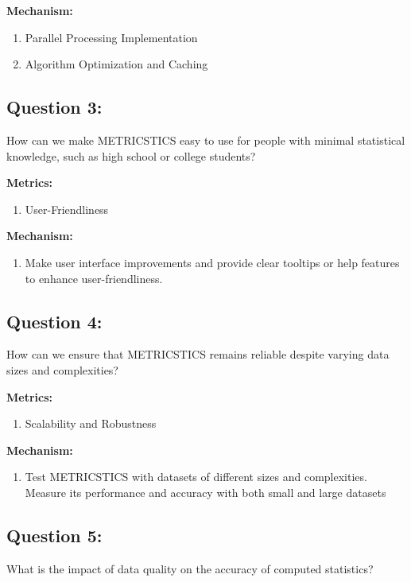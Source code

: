 \documentclass[12pt,letterpaper]{report}
\begin{document}
\item \textbf{Mechanism:}

\begin{enumerate}
        \item Parallel Processing Implementation
        \item Algorithm Optimization and Caching
\end{enumerate}

\subsection*{Question 3:} How can we make METRICSTICS easy to use for people with minimal statistical knowledge, such as high school or college students?

\item \textbf{Metrics:}

\begin{enumerate}
        \item User-Friendliness
\end{enumerate}

\item \textbf{Mechanism:}
\begin{enumerate}
        \item Make user interface improvements and provide clear tooltips or help features to enhance user-friendliness.
\end{enumerate}

\subsection*{Question 4:} How can we ensure that METRICSTICS remains reliable despite varying data sizes and complexities?

\item \textbf{Metrics:}

\begin{enumerate}
        \item Scalability and Robustness
\end{enumerate}

\item \textbf{Mechanism:}
\begin{enumerate}
        \item Test METRICSTICS with datasets of different sizes and complexities. Measure its performance and accuracy with both small and large datasets
\end{enumerate}

\subsection*{Question 5:} What is the impact of data quality on the accuracy of computed statistics?
\end{document}
